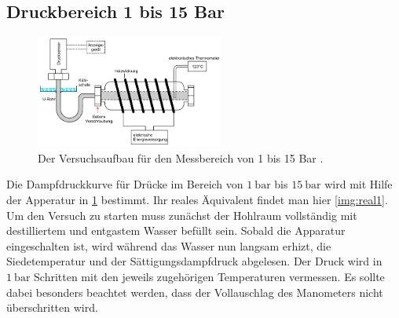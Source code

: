 \subsection{Druckbereich 1 bis 15 Bar}
\begin{figure}[H]
    \centering
    \includegraphics[width=0.55\textwidth]{images/Abbildung4.PNG}
    \caption{Der Versuchsaufbau für den Messbereich von 1 bis 15 Bar \protect \cite{V203}.}
    \label{img:aufbau2}
\end{figure}
Die Dampfdruckkurve für Drücke im Bereich von $\SI{1}{\bar}$ bis $\SI{15}{\bar}$ wird mit Hilfe der Apperatur in \ref{img:aufbau2} bestimmt. 
Ihr reales Äquivalent findet man hier \ref{img:real1}.\\
Um den Versuch zu starten muss zunächst der Hohlraum vollständig mit destilliertem und entgastem Wasser befüllt sein.
Sobald die Ap­pa­ra­tur eingeschalten ist, wird während das Wasser nun langsam erhizt, 
die Siedetemperatur und der Sättigungsdampfdruck abgelesen. Der Druck wird in $\SI{1}{\bar}$ Schritten mit den jeweils zugehörigen Temperaturen vermessen. 
Es sollte dabei besonders beachtet werden, dass der Vollauschlag des Manometers nicht überschritten wird. 